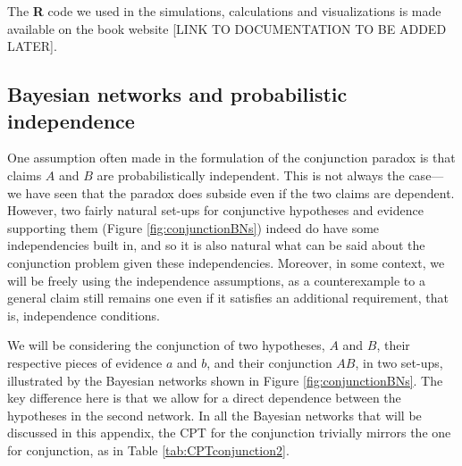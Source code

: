 \documentclass[
  10pt,
  dvipsnames,enabledeprecatedfontcommands]{scrartcl}
\begin{document}
The \textsf{\textbf{R}} code we used in the simulations, calculations
and visualizations is made available on the book website {[}LINK TO
DOCUMENTATION TO BE ADDED LATER{]}.

\hypertarget{bayesian-networks-and-probabilistic-independence}{%
\subsection*{Bayesian networks and probabilistic
independence}\label{bayesian-networks-and-probabilistic-independence}}

One assumption often made in the formulation of the conjunction paradox
is that claims \(A\) and \(B\) are probabilistically independent. This
is not always the case---we have seen that the paradox does subside even
if the two claims are dependent. However, two fairly natural set-ups for
conjunctive hypotheses and evidence supporting them (Figure
\ref{fig:conjunctionBNs}) indeed do have some independencies built in,
and so it is also natural what can be said about the conjunction problem
given these independencies. Moreover, in some context, we will be freely
using the independence assumptions, as a counterexample to a general
claim still remains one even if it satisfies an additional requirement,
that is, independence conditions.

We will be considering the conjunction of two hypotheses, \(A\) and
\(B\), their respective pieces of evidence \(a\) and \(b\), and their
conjunction \(AB\), in two set-ups, illustrated by the Bayesian networks
shown in Figure \ref{fig:conjunctionBNs}. The key difference here is
that we allow for a direct dependence between the hypotheses in the
second network. In all the Bayesian networks that will be discussed in
this appendix, the CPT for the conjunction trivially mirrors the one for
conjunction, as in Table \ref{tab:CPTconjunction2}.

\vspace{1mm}
\footnotesize

\normalsize
\end{document}
